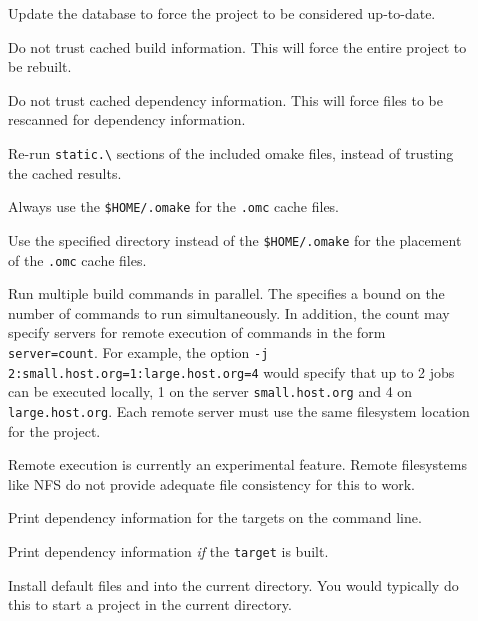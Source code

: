 \begin{description}
\item[] Update the  database to force the project to be considered up-to-date.

\item[] Do not trust cached build information.  This will force the entire project to be rebuilt.

\item[] Do not trust cached dependency information.  This will force files to be rescanned
for dependency information.

\item[] Re-run \verb+static.\+ sections of the included omake files, instead of
trusting the cached results.

\item[] Always use the \verb+$HOME/.omake+ for the \verb+.omc+ cache files.

\item[] Use the specified directory instead of the \verb+$HOME/.omake+
for the placement of the \verb+.omc+ cache files.

\item[] Run multiple build commands in parallel.  The  specifies a
bound on the number of commands to run simultaneously.  In addition, the count may specify servers
for remote execution of commands in the form \verb+server=count+.  For example, the option
\verb+-j 2:small.host.org=1:large.host.org=4+ would specify that up to 2 jobs can be executed
locally, 1 on the server \verb+small.host.org+ and 4 on \verb+large.host.org+.  Each remote server
must use the same filesystem location for the project.

Remote execution is currently an experimental feature.  Remote filesystems like NFS do not provide
adequate file consistency for this to work.

\item[] Print dependency information for the targets on the command line.

\item[] Print dependency information \emph{if} the \verb+target+ is built.

\item[] Install default files  and  into the current
  directory.  You would typically do this to start a project in the current directory.


\end{description}
